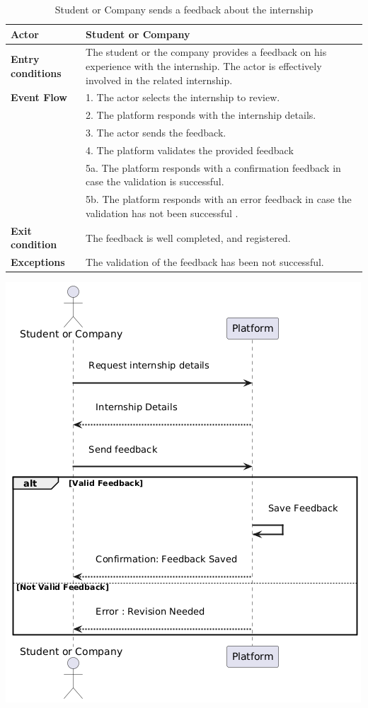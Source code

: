 \begin{table}[h!]
    \centering
    \begin{tabular}{lp{10cm}}
        \textbf{Actor} & Student or Company \\ \hline
        \textbf{Entry conditions} & The student or the company provides a feedback on his experience with the internship. The actor is effectively involved in the related internship.\\ \hline
        \textbf{Event Flow} &
        1. The actor selects the internship to review. \\
        & 2. The platform responds with the internship details. \\
        & 3. The actor sends the feedback. \\
        & 4. The platform validates the provided feedback \\
        & 5a. The platform responds with a confirmation feedback in case the validation is successful. \\
        & 5b. The platform responds with an error feedback in case the validation has not been successful . \\
        \hline \textbf{Exit condition} & The feedback is well completed, and registered.\\
        \hline \textbf{Exceptions} & The validation of the feedback has been not successful. \\ \end{tabular}
    \caption{ Student or Company sends a feedback about the internship}
    \label{tab:company_manage_internship_applications}
\end{table}

\begin{center}
    \includegraphics[scale = 0.8]{Images/ImagesRASD/StudentAndCompanySendFeedback.png}
\end{center}
\newpage

